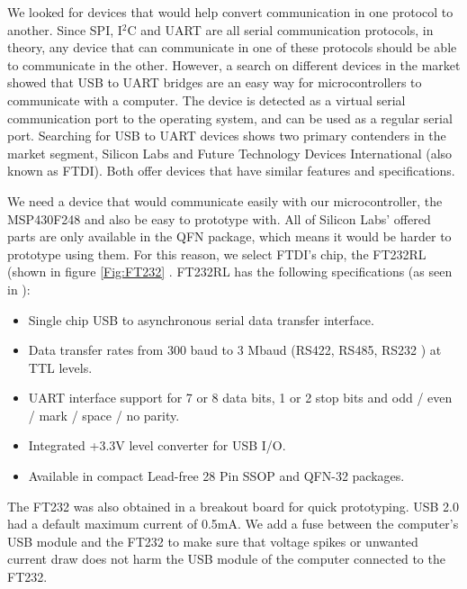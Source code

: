 We looked for devices that would help convert communication in one protocol to another. Since SPI, I$^2$C and UART are all serial communication protocols, in theory, any device that can communicate in one of these protocols should be able to communicate in the other. However, a search on different devices in the market showed that USB to UART bridges are an easy way for microcontrollers to communicate with a computer. The device is detected as a virtual serial communication port to the operating system, and can be used as a regular serial port. Searching for USB to UART devices shows two primary contenders in the market segment, Silicon Labs and Future Technology Devices International (also known as FTDI). Both offer devices that have similar features and specifications. 

We need a device that would communicate easily with our microcontroller, the MSP430F248 and also be easy to prototype with. All of Silicon Labs' offered parts are only available in the QFN package, which means it would be harder to prototype using them. For this reason, we select FTDI's chip, the FT232RL (shown in figure \ref{Fig:FT232} \cite{Web:FTIMG}. FT232RL has the following specifications (as seen in \cite{FT232Datasheet}):

\begin{itemize}
	\item Single chip USB to asynchronous serial data transfer interface.
	\item Data transfer rates from 300 baud to 3 Mbaud (RS422, RS485, RS232 ) at TTL levels.
	\item UART interface support for 7 or 8 data bits, 1 or 2 stop bits and odd / even / mark / space / no parity.
	\item Integrated +3.3V level converter for USB I/O.
	\item Available in compact Lead-free 28 Pin SSOP and QFN-32 packages.
\end{itemize}

The FT232 was also obtained in a breakout board for quick prototyping.
USB 2.0 had a default maximum current of 0.5mA. We add a fuse between the computer's USB module and the FT232 to make sure that voltage spikes or unwanted current draw does not harm the USB module of the computer connected to the FT232.


